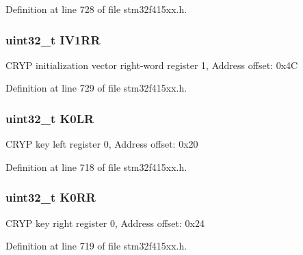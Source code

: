 Definition at line 728 of file stm32f415xx.\+h.

\subsubsection[{\texorpdfstring{I\+V1\+RR}{IV1RR}}]{ uint32\+\_\+t I\+V1\+RR}\hypertarget{struct_c_r_y_p___type_def_a38a9f05c03174023fc6ac951c04eaeff}{}\label{struct_c_r_y_p___type_def_a38a9f05c03174023fc6ac951c04eaeff}
C\+R\+YP initialization vector right-\/word register 1, Address offset\+: 0x4C 

Definition at line 729 of file stm32f415xx.\+h.

\subsubsection[{\texorpdfstring{K0\+LR}{K0LR}}]{ uint32\+\_\+t K0\+LR}\hypertarget{struct_c_r_y_p___type_def_a3ca109e86323625e5f56f92f999c3b05}{}\label{struct_c_r_y_p___type_def_a3ca109e86323625e5f56f92f999c3b05}
C\+R\+YP key left register 0, Address offset\+: 0x20 

Definition at line 718 of file stm32f415xx.\+h.

\subsubsection[{\texorpdfstring{K0\+RR}{K0RR}}]{ uint32\+\_\+t K0\+RR}\hypertarget{struct_c_r_y_p___type_def_ae6d97d339f0091d4a105001ea59086ae}{}\label{struct_c_r_y_p___type_def_ae6d97d339f0091d4a105001ea59086ae}
C\+R\+YP key right register 0, Address offset\+: 0x24 

Definition at line 719 of file stm32f415xx.\+h.

